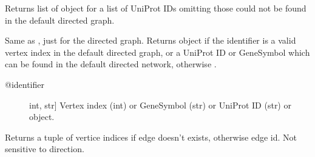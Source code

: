 \documentclass[letterpaper,10pt,english]{sphinxmanual}
\begin{document}
\begin{fulllineitems}
\begin{fulllineitems}
\begin{description}
\end{description}

\end{fulllineitems}


\begin{fulllineitems}
\label{\detokenize{main:pypath.main.PyPath.dups}}
Returns list of  object
for a list of UniProt IDs omitting those
could not be found in the default
directed graph.

\end{fulllineitems}


\begin{fulllineitems}
\label{\detokenize{main:pypath.main.PyPath.dv}}
Same as , just for the directed graph.
Returns  object if the identifier
is a valid vertex index in the default directed graph,
or a UniProt ID or GeneSymbol which can be found in the
default directed network, otherwise .
\begin{description}
\item[{@identifier}] \leavevmode{[}int, str{]}
Vertex index (int) or GeneSymbol (str) or UniProt ID (str) or
 object.

\end{description}

\end{fulllineitems}


\begin{fulllineitems}
\label{\detokenize{main:pypath.main.PyPath.dvs}}
\end{fulllineitems}


\begin{fulllineitems}
\label{\detokenize{main:pypath.main.PyPath.edge_exists}}
Returns a tuple of vertice indices if edge doesn’t exists,
otherwise edge id. Not sensitive to direction.


\end{fulllineitems}
\end{fulllineitems}
\end{document}
